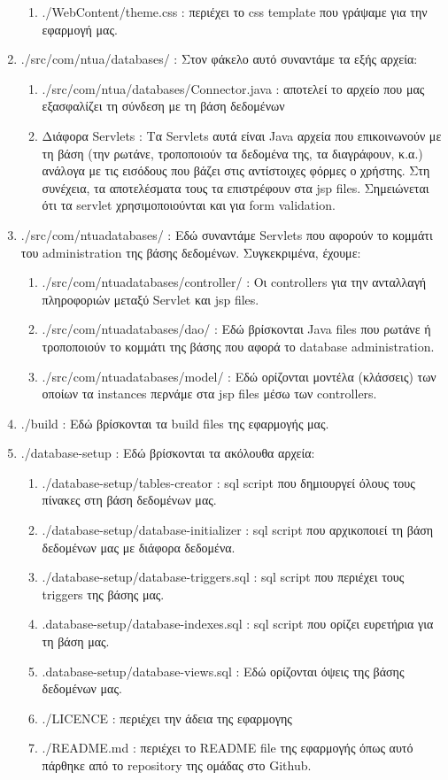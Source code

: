 \documentclass[a4paper,oneside, 11pt]{article}
\begin{document}
\begin{enumerate}
\begin{enumerate}
\item ./WebContent/theme.css : περιέχει το css template που γράψαμε για την εφαρμογή μας.
\end{enumerate}
\item ./src/com/ntua/databases/ : Στον φάκελο αυτό συναντάμε τα εξής αρχεία:
\begin{enumerate}
\item ./src/com/ntua/databases/Connector.java : αποτελεί το αρχείο που μας εξασφαλίζει τη σύνδεση με τη βάση δεδομένων
\item Διάφορα Servlets : Τα Servlets αυτά είναι Java αρχεία που επικοινωνούν με τη βάση (την ρωτάνε, τροποποιούν τα δεδομένα της, τα διαγράφουν, κ.α.) ανάλογα με τις εισόδους που βάζει στις αντίστοιχες φόρμες ο χρήστης. Στη συνέχεια, τα αποτελέσματα τους τα επιστρέφουν στα jsp files. Σημειώνεται ότι τα servlet χρησιμοποιούνται και για form validation.
\end{enumerate}
\item ./src/com/ntuadatabases/ : Εδώ συναντάμε Servlets που αφορούν το κομμάτι του administration της βάσης δεδομένων. Συγκεκριμένα, έχουμε:
\begin{enumerate}
\item ./src/com/ntuadatabases/controller/ : Οι controllers για την ανταλλαγή πληροφοριών μεταξύ Servlet και jsp files.
\item ./src/com/ntuadatabases/dao/ : Εδώ βρίσκονται Java files που ρωτάνε ή τροποποιούν το κομμάτι της βάσης που αφορά το database administration.
\item ./src/com/ntuadatabases/model/ : Εδώ ορίζονται μοντέλα (κλάσσεις) των οποίων τα instances περνάμε στα jsp files μέσω των controllers.
\end{enumerate}
\item ./build : Εδώ βρίσκονται τα build files της εφαρμογής μας.
\item ./database-setup : Εδώ βρίσκονται τα ακόλουθα αρχεία:
\begin{enumerate}
\item ./database-setup/tables-creator : sql script που δημιουργεί όλους τους πίνακες στη βάση δεδομένων μας.
\item ./database-setup/database-initializer : sql script που αρχικοποιεί τη βάση δεδομένων μας με διάφορα δεδομένα.
\item ./database-setup/database-triggers.sql : sql script που περιέχει τους triggers της βάσης μας.
\item .database-setup/database-indexes.sql : sql script που ορίζει ευρετήρια για τη βάση μας.
\item .database-setup/database-views.sql : Εδώ ορίζονται όψεις της βάσης δεδομένων μας.

\item ./LICENCE : περιέχει την άδεια της εφαρμογης 
\item ./README.md : περιέχει το README file της εφαρμογής όπως αυτό πάρθηκε από το repository της ομάδας στο Github.
\end{enumerate}
\end{enumerate}
\end{document}
